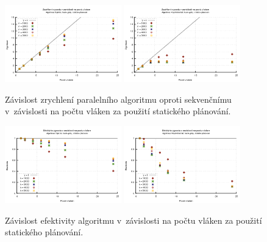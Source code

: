 \begin{figure}
    \centering
    \includegraphics[width=0.45\textwidth]{../grafy/02_openMP/02-02-Dijkstra_zrychleni_v1}
    \includegraphics[width=0.45\textwidth]{../grafy/02_openMP/02-02-Floyd_zrychleni_v1}
    \caption{Závislost zrychlení paralelního algoritmu oproti sekvenčnímu v~závislosti na počtu vláken za použití statického plánování.}
    \label{f:mer:zry}
\end{figure}

\begin{figure}
    \centering
    \includegraphics[width=0.45\textwidth]{../grafy/02_openMP/02-03-Dijkstra_efektivita_v1}
    \includegraphics[width=0.45\textwidth]{../grafy/02_openMP/02-03-Floyd_efektivita_v1}
    \caption{Závislost efektivity algoritmu v~závislosti na počtu vláken za použití statického plánování.}
    \label{f:mer:efe}
\end{figure}


